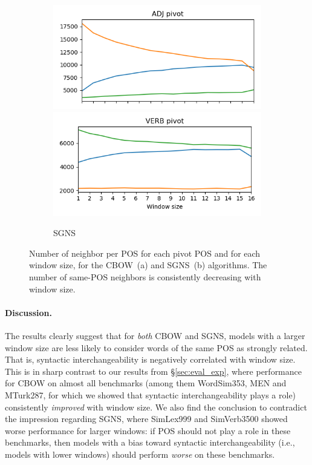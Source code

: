 \documentclass[11pt,a4paper]{article}
\begin{document}
\begin{figure}[h]
\begin{subfigure}[b]{.5\textwidth}
        \includegraphics[width=\textwidth]{ADJ_nn_100_fasttext_enwiki-20170501-clean_skipgram-300d-min500_pos.png}
        \includegraphics[width=\textwidth]{VERB_nn_100_fasttext_enwiki-20170501-clean_skipgram-300d-min500_pos.png}
        \caption{SGNS}
        \end{subfigure}
        \caption{Number of neighbor per POS for each pivot POS and for each window size,
        for the CBOW~(a) and SGNS~(b) algorithms.
        The number of same-POS neighbors is consistently decreasing with window size.
        \label{fig:nn_pos_hist}}
    \end{figure}
    
    \paragraph{Discussion.}
    
    The results clearly suggest that for \textit{both} CBOW and SGNS,
    models with a larger window size are less likely to consider words
    of the same POS as strongly related.
    That is, syntactic interchangeability is negatively correlated with window size.
    This is in sharp contrast to our results from \S\ref{sec:eval_exp},
    where performance for CBOW on almost all benchmarks
    (among them  WordSim353, MEN and MTurk287, for which we showed that
    syntactic interchangeability plays a role) consistently
    \textit{improved} with window size.
    We also find the conclusion to contradict the impression regarding SGNS,
    where SimLex999 and SimVerb3500 showed worse performance for larger windows:
    if POS should not play a role in these benchmarks,
    then models with a bias toward syntactic interchangeability (i.e., models with lower windows)
    should perform \textit{worse} on these benchmarks.
    
\end{document}
